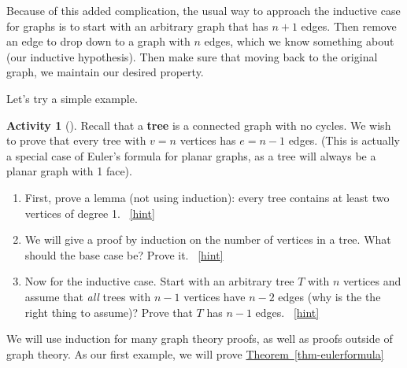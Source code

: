 \documentclass[10pt,]{book}
\newcommand{\terminology}[1]{\textbf{#1}}
\theoremstyle{plain}
\theoremstyle{definition}
\theoremstyle{definition}
\theoremstyle{definition}
\newtheorem{activity}[project]{Activity}
\numberwithin{equation}{chapter}
\begin{document}
\par
\hypertarget{p-241}{}%
Because of this added complication, the usual way to approach the inductive case for graphs is to start with an arbitrary graph that has \(n+1\) edges.  Then remove an edge to drop down to a graph with \(n\) edges, which we know something about (our inductive hypothesis).  Then make sure that moving back to the original graph, we maintain our desired property.%
\par
\hypertarget{p-242}{}%
Let's try a simple example.%
\begin{activity}[]\label{activity-18}
\hypertarget{p-243}{}%
Recall that a \terminology{tree} is a connected graph with no cycles.  We wish to prove that every tree with \(v = n\) vertices has \(e = n-1\) edges.  (This is actually a special case of Euler's formula for planar graphs, as a tree will always be a planar graph with 1 face).%
\begin{enumerate}[font=\bfseries,label=(\alph*),ref=\alph*]
\item\label{task-28} \hypertarget{p-244}{}%
First, prove a lemma (not using induction): every tree contains at least two vertices of degree 1.%
~\hfill{\tiny\hyperlink{a-23.a}{[hint]}\hypertarget{q-23.a}{}}\item\label{task-29} \hypertarget{p-246}{}%
We will give a proof by induction on the number of vertices in a tree.  What should the base case be?  Prove it.%
~\hfill{\tiny\hyperlink{a-23.b}{[hint]}\hypertarget{q-23.b}{}}\item\label{task-30} \hypertarget{p-248}{}%
Now for the inductive case.  Start with an arbitrary tree \(T\) with \(n\) vertices and assume that \emph{all} trees with \(n-1\) vertices have \(n-2\) edges (why is the the right thing to assume)?  Prove that \(T\) has \(n-1\) edges.%
~\hfill{\tiny\hyperlink{a-23.c}{[hint]}\hypertarget{q-23.c}{}}\end{enumerate}
\end{activity}
\hypertarget{p-250}{}%
We will use induction for many graph theory proofs, as well as proofs outside of graph theory.  As our first example, we will prove \hyperref[thm-eulerformula]{Theorem~\ref{thm-eulerformula}}%
\typeout{************************************************}
\typeout{************************************************}
\end{document}
